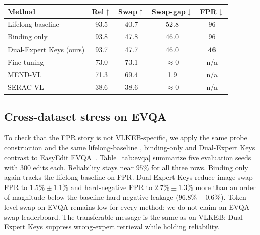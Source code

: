 \documentclass[letterpaper]{article} %
\begin{document}
\begin{center}
\small
\setlength{\tabcolsep}{3pt}
\begin{tabular}{@{}lcccc@{}}
\toprule
Method & Rel$\uparrow$ & Swap$\uparrow$ & Swap-gap$\downarrow$ & FPR$\downarrow$ \\
\midrule
Lifelong baseline & 93.5 & 40.7 & 52.8 & 96 \\
Binding only & 93.8 & 47.8 & 46.0 & 96 \\
Dual-Expert Keys (ours) & 93.7 & 47.7 & 46.0 & \textbf{46} \\
Fine-tuning & 73.0 & 73.1 & $\approx$0 & n/a \\
MEND-VL & 71.3 & 69.4 & 1.9 & n/a \\
SERAC-VL & 38.6 & 38.6 & $\approx$0 & n/a \\
\bottomrule
\end{tabular}
\label{tab:competitors}
\end{center}

\subsection{Cross-dataset stress on EVQA}
To check that the FPR story is not VLKEB-specific, we apply the same probe construction and the same lifelong-baseline , binding-only and Dual-Expert Keys contrast to EasyEdit EVQA~\cite{wang2024easyedit}.
Table~\ref{tab:evqa} summarize five evaluation seeds with $300$ edits each.
Reliability stays near $95\%$ for all three rows.
Binding only again tracks the lifelong baseline on FPR.
Dual-Expert Keys reduce image-swap FPR to $1.5\%{\pm}1.1\%$ and hard-negative FPR to $2.7\%{\pm}1.3\%$ more than an order of magnitude below the baseline hard-negative leakage ($96.8\%{\pm}0.6\%$).
Token-level swap on EVQA remains low for every method; we do not claim an EVQA swap leaderboard.
The transferable message is the same as on VLKEB: Dual-Expert Keys suppress wrong-expert retrieval while holding reliability.

\end{document}
